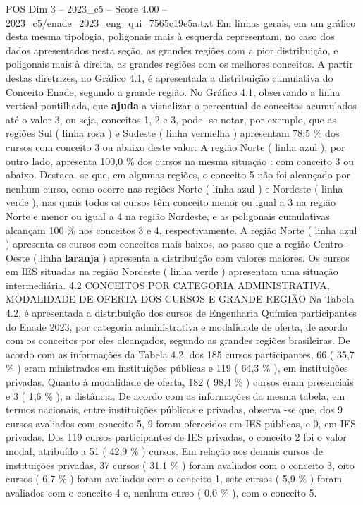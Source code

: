 \begin{textsample}{POS Dim 3 – 2023\_c5 – Score 4.00 – 2023\_c5/enade\_2023\_eng\_qui\_7565c19e5a.txt}
Em linhas gerais, em um gráfico desta mesma tipologia, poligonais mais à esquerda representam, no caso dos dados apresentados nesta seção, as grandes regiões com a pior distribuição, e poligonais mais à direita, as grandes regiões com os melhores conceitos.
A partir destas diretrizes, no Gráfico 4.1, é apresentada a distribuição cumulativa do Conceito Enade, segundo a grande região.
No Gráfico 4.1, observando a linha vertical pontilhada, que \textbf{ajuda} a visualizar o percentual de conceitos acumulados até o valor 3, ou seja, conceitos 1, 2 e 3, pode -se notar, por exemplo, que as regiões Sul ( linha rosa ) e Sudeste ( linha vermelha ) apresentam 78,5 \% dos cursos com conceito 3 ou abaixo deste valor.
A região Norte ( linha azul ), por outro lado, apresenta 100,0 \% dos cursos na mesma situação : com conceito 3 ou abaixo.
Destaca -se que, em algumas regiões, o conceito 5 não foi alcançado por nenhum curso, como ocorre nas regiões Norte ( linha azul ) e Nordeste ( linha verde ), nas quais todos os cursos têm conceito menor ou igual a 3 na região Norte e menor ou igual a 4 na região Nordeste, e as poligonais cumulativas alcançam 100 \% nos conceitos 3 e 4, respectivamente.
A região Norte ( linha azul ) apresenta os cursos com conceitos mais baixos, ao passo que a região Centro-Oeste ( linha \textbf{laranja} ) apresenta a distribuição com valores maiores.
Os cursos em IES situadas na região Nordeste ( linha verde ) apresentam uma situação intermediária. 4.2 CONCEITOS POR CATEGORIA ADMINISTRATIVA, MODALIDADE DE OFERTA DOS CURSOS E GRANDE REGIÃO Na Tabela 4.2, é apresentada a distribuição dos cursos de Engenharia Química participantes do Enade 2023, por categoria administrativa e modalidade de oferta, de acordo com os conceitos por eles alcançados, segundo as grandes regiões brasileiras.
De acordo com as informações da Tabela 4.2, dos 185 cursos participantes, 66 ( 35,7 \% ) eram ministrados em instituições públicas e 119 ( 64,3 \% ), em instituições privadas.
Quanto à modalidade de oferta, 182 ( 98,4 \% ) cursos eram presenciais e 3 ( 1,6 \% ), a distância.
De acordo com as informações da mesma tabela, em termos nacionais, entre instituições públicas e privadas, observa -se que, dos 9 cursos avaliados com conceito 5, 9 foram oferecidos em IES públicas, e 0, em IES privadas.
Dos 119 cursos participantes de IES privadas, o conceito 2 foi o valor modal, atribuído a 51 ( 42,9 \% ) cursos.
Em relação aos demais cursos de instituições privadas, 37 cursos ( 31,1 \% ) foram avaliados com o conceito 3, oito cursos ( 6,7 \% ) foram avaliados com o conceito 1, sete cursos ( 5,9 \% ) foram avaliados com o conceito 4 e, nenhum curso ( 0,0 \% ), com o conceito 5.

\end{textsample}

